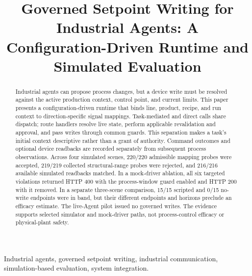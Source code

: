 \documentclass[journal]{IEEEtran}
\begin{document}

\title{Governed Setpoint Writing for Industrial Agents: A Configuration-Driven Runtime and Simulated Evaluation}

\author{}

\maketitle

\begin{abstract}
Industrial agents can propose process changes, but a device write must be resolved against the active production context, control point, and current limits. This paper presents a configuration-driven runtime that binds line, product, recipe, and run context to direction-specific signal mappings. Task-mediated and direct calls share dispatch; route handlers resolve live state, perform applicable revalidation and approval, and pass writes through common guards. This separation makes a task's initial context descriptive rather than a grant of authority. Command outcomes and optional device readbacks are recorded separately from subsequent process observations. Across four simulated scenes, 220/220 admissible mapping probes were accepted, 219/219 collected structural-range probes were rejected, and 216/216 available simulated readbacks matched. In a mock-driver ablation, all six targeted violations returned HTTP 400 with the process-window guard enabled and HTTP 200 with it removed. In a separate three-scene comparison, 15/15 scripted and 0/15 no-write endpoints were in band, but their different endpoints and horizons preclude an efficacy estimate. The live-Agent pilot issued no governed writes. The evidence supports selected simulator and mock-driver paths, not process-control efficacy or physical-plant safety.
\end{abstract}

\begin{IEEEkeywords}
Industrial agents, governed setpoint writing, industrial communication,
simulation-based evaluation, system integration.
\end{IEEEkeywords}

\IEEEpeerreviewmaketitle








\end{document}

